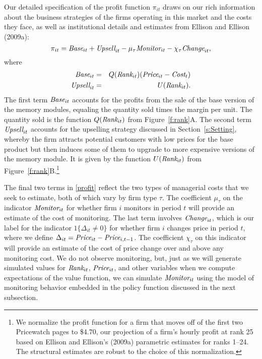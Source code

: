 \documentclass[11pt]{article}
\newcommand{\Price}{\mbox{\it Price}}
\newcommand{\Cost}{\mbox{\it Cost}}
\newcommand{\Rank}{\mbox{\it Rank}}
\newcommand{\Base}{\mbox{\it Base}}
\newcommand{\Upsell}{\mbox{\it Upsell}}
\newcommand{\Monitor}{\mbox{\it Monitor}}
\newcommand{\Change}{\mbox{\it Change}}
\begin{document}
\begin{spacing}{1.3}
Our detailed specification of the profit function $\pi_{it}$ draws on
our rich information about the business strategies of the firms
operating in this market and the costs they face, as well as
institutional details and estimates from Ellison and Ellison (2009a):
\begin{equation}
\label{profit}
\pi_{it} = \Base_{it} + \Upsell_{it} - \mu_{\tau} \Monitor_{it} -
\chi_{\tau} \Change_{it},
\end{equation}
where
\begin{eqnarray}
\Base_{it} & = & Q(\Rank_{it}) (\Price_{it} - \Cost_t) \label{base} \\ 
\Upsell_{it} & = & U(\Rank_{it}). \label{upsell}
\end{eqnarray}
The first term $\Base_{it}$ accounts for the profits from the sale of
the base version of the memory modules, equaling the quantity sold
times the margin per unit. The quantity sold is the function
$Q(\Rank_{it})$ from Figure~\ref{f:rank}A.  The second term
$\Upsell_{it}$ accounts for the upselling strategy discussed in
Section~\ref{s:Setting}, whereby the firm attracts potential customers
with low prices for the base product but then induces some of them to
upgrade to more expensive versions of the memory module. It is given
by the function $U(\Rank_{it})$ from
Figure~\ref{f:rank}B.\footnote{\label{fn:25}We normalize the profit
  function for a firm that moves off of the first two Pricewatch pages
  to \$4.70, our projection of a firm's hourly profit at rank 25 based
  on Ellison and Ellison's (2009a) parametric estimates for ranks
  1--24. The structural estimates are robust to the choice of this
  normalization.}

The final two terms in \eqref{profit} reflect the two types of
managerial costs that we seek to estimate, both of which vary by firm
type $\tau$. The coefficient $\mu_{\tau}$ on the indicator
$\Monitor_{it}$ for whether firm $i$ monitors in period $t$ will
provide an estimate of the cost of monitoring.  The last term involves
$\Change_{it}$, which is our label for the indicator $1\{\Delta_{it}
\neq 0\}$ for whether firm $i$ changes price in period $t$, where we
define $\Delta_{it} = \Price_{it} - \Price_{i,t-1}$. The coefficient
$\chi_{\tau}$ on this indicator will provide an estimate of the cost
of price change over and above any monitoring cost. We do not observe
monitoring, but, just as we will generate simulated values for
$\Rank_{it}$, $\Price_{it}$, and other variables when we compute
expectations of the value function, we can simulate $\Monitor_{it}$
using the model of monitoring behavior embedded in the policy function
discussed in the next subsection.


\end{spacing}
\end{document}
